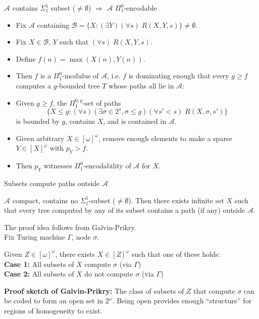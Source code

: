 \begin{frame}{$\mathcal{A}$ contains $\Sigma_1^1$ subset ($\neq\emptyset$)
$\Rightarrow$ $\mathcal{A}$ $\Pi_1^0$-encodable}
  \begin{itemize}
    \item Fix $\mathcal{A}$ containing $\mathcal{B} =\{X: (\exists
      Y)(\forall s)\; R(X,Y,s)\} \neq\emptyset$.
    \item Fix $X\in\mathcal{B}$, $Y$ such that $(\forall s)\;R(X,Y,s)$.
    \item Define $f(n)=\max(X(n),Y(n))$.
    \item Then $f$ is a $\Pi_1^0$-modulus of $\mathcal{A}$, i.e. $f$ is
      dominating enough that every $g\geq f$ computes a $g$-bounded tree
      $T$ whose paths all lie in $\mathcal{A}$:
    \item Given $g\geq f$, the $\Pi_1^{0,g}$-set of paths
      \[\{X\leq g:(\forall s)(\exists \sigma\in 2^s, \sigma\leq g)(\forall
      s'<s)\; R(X,\sigma,s')\}\]
      is bounded by $g$, contains $X$, and is contained in $\mathcal{A}$.
    \item Given arbitrary $X\in[\omega]^\omega$, remove enough elements to
      make a sparse $Y\in[X]^\omega$ with $p_Y>f$.
    \item Then $p_Y$ witnesses $\Pi_1^0$-encodability of $\mathcal{A}$ for
      $X$.
  \end{itemize}
\end{frame}

\begin{frame}{Subsets compute paths outside $\mathcal{A}$}
  \begin{main-thm*}
    $\mathcal{A}$ compact, contains no $\Sigma_1^1$-subset
    ($\neq\emptyset$). Then there exists infinite set $X$ such that every
    tree computed by any of its subset contains a path (if any) outside
    $\mathcal{A}$.
  \end{main-thm*}

  The proof idea follows from Galvin-Prikry.\\
  Fix Turing machine $\Gamma$, node $\sigma$.
  \begin{Fact}
    Given $Z\in[\omega]^\omega$, there exists $X\in[Z]^\omega$ such that
    one of these holds:\\
    \textbf{Case 1:} All subsets of $X$ compute $\sigma$ (via $\Gamma$)\\
    \textbf{Case 2:} All subsets of $X$ do not compute $\sigma$ (via
    $\Gamma$)
  \end{Fact}
  \textbf{Proof sketch of Galvin-Prikry:} The class of subsets of $Z$ that
  compute $\sigma$ can be coded to form an open set in $2^\omega$. Being
  open provides enough ``structure'' for regions of homogeneity to exist.
\end{frame}

